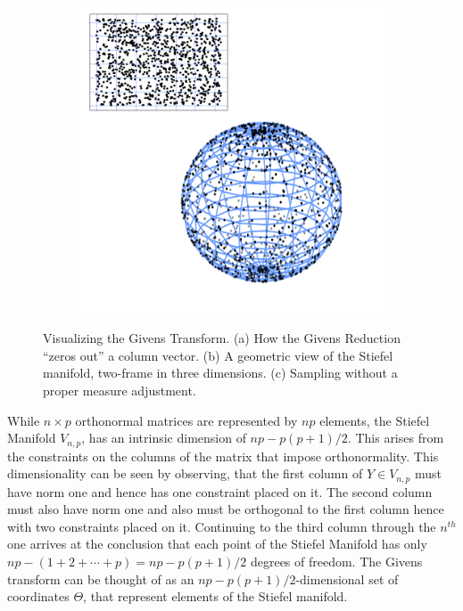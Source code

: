 \documentclass{article}
\begin{document}
\begin{figure}
\begin{subfigure}[b]{0.3\textwidth}
        \caption{}
        \label{fig:GivensReductionm}
    \end{subfigure}
    ~ %
    \begin{subfigure}[b]{0.3\textwidth}
        \includegraphics[width=\textwidth]{AreaForm.pdf}
        \caption{}
        \label{fig:AreaForm}
    \end{subfigure}
    \caption{Visualizing the Givens Transform. (a) How the Givens Reduction ``zeros out'' a column vector. (b) A geometric view of the Stiefel manifold, two-frame in three dimensions. (c) Sampling without a proper measure adjustment. }\label{fig:Givens}
\end{figure}
 
While $n \times p$ orthonormal matrices are represented by $np$ elements, the Stiefel Manifold $V_{n,p}$, has an intrinsic dimension of $np-p(p+1)/2$. This arises from the constraints on the columns of the matrix that impose orthonormality.  This dimensionality can be seen by observing, that the first column of $Y \in V_{n,p}$ must have norm one and hence has one constraint placed on it. The second column must also have norm one and also must be orthogonal to the first column hence with two constraints placed on it.  Continuing to the third column through the $n^{th}$ one arrives at the conclusion that each point of the Stiefel Manifold has only $np - (1+2+\cdots+p) =np-p(p+1)/2$ degrees of freedom.  The Givens transform can be thought of as an $np-p(p+1)/2$-dimensional set of coordinates $\Theta$, that represent elements of the Stiefel manifold.
\end{document}

